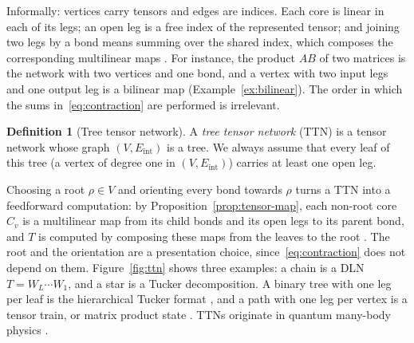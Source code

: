 \documentclass[11pt]{article}
\newcommand{\Eint}{E_{\mathrm{int}}}
\theoremstyle{definition}
\newtheorem{definition}[theorem]{Definition}
\numberwithin{equation}{section}
\begin{document}
Informally: vertices carry tensors and edges are indices. Each core is linear in each of its legs; an open leg is a free index of the represented tensor; and joining two legs by a bond means summing over the shared index, which composes the corresponding multilinear maps \citep[Proposition~A.4]{furman2026benign}. For instance, the product $AB$ of two matrices is the network with two vertices and one bond, and a vertex with two input legs and one output leg is a bilinear map (Example~\ref{ex:bilinear}). The order in which the sums in~\eqref{eq:contraction} are performed is irrelevant.

\begin{definition}[Tree tensor network]\label{def:ttn}
A \emph{tree tensor network} (TTN) is a tensor network whose graph $(V,\Eint)$ is a tree. We always assume that every leaf of this tree (a vertex of degree one in $(V,\Eint)$) carries at least one open leg.
\end{definition}

Choosing a root $\rho\in V$ and orienting every bond towards $\rho$ turns a TTN into a feedforward computation: by Proposition~\ref{prop:tensor-map}, each non-root core $C_v$ is a multilinear map from its child bonds and its open legs to its parent bond, and $T$ is computed by composing these maps from the leaves to the root \citep[Definition~3.1 and Appendix~A.3]{furman2026benign}. The root and the orientation are a presentation choice, since~\eqref{eq:contraction} does not depend on them. Figure~\ref{fig:ttn} shows three examples: a chain is a DLN $T=W_L\cdots W_1$, and a star is a Tucker decomposition. A binary tree with one leg per leaf is the hierarchical Tucker format \citep{hackbusch2009new,grasedyck2010hierarchical}, and a path with one leg per vertex is a tensor train, or matrix product state \citep{oseledets2011tensor}. TTNs originate in quantum many-body physics \citep{shi2006classical}.
\end{document}
